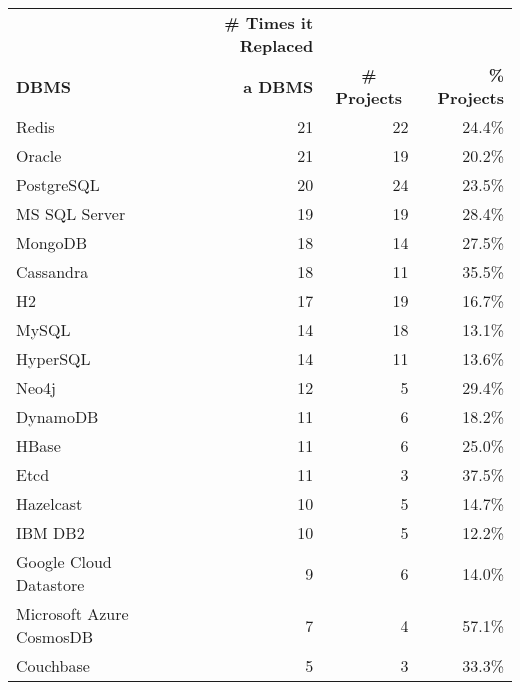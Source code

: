 \begin{tabular}{lrrr}
\hline
\multicolumn{1}{l}{\textbf{}} & \multicolumn{1}{r}{\textbf{\# Times it Replaced}} & \multicolumn{1}{c}{\textbf{}} & \textbf{} \\
\multicolumn{1}{l}{\textbf{DBMS}} & \multicolumn{1}{r}{\textbf{ a DBMS}} & \multicolumn{1}{c}{\textbf{\# Projects}} & \textbf{\% Projects} \\
\hline
                   Redis &                          21 &          22 &       24.4\% \\
                  Oracle &                          21 &          19 &       20.2\% \\
              PostgreSQL &                          20 &          24 &       23.5\% \\
           MS SQL Server &                          19 &          19 &       28.4\% \\
                 MongoDB &                          18 &          14 &       27.5\% \\
               Cassandra &                          18 &          11 &       35.5\% \\
                      H2 &                          17 &          19 &       16.7\% \\
                   MySQL &                          14 &          18 &       13.1\% \\
                HyperSQL &                          14 &          11 &       13.6\% \\
                   Neo4j &                          12 &           5 &       29.4\% \\
                DynamoDB &                          11 &           6 &       18.2\% \\
                   HBase &                          11 &           6 &       25.0\% \\
                    Etcd &                          11 &           3 &       37.5\% \\
               Hazelcast &                          10 &           5 &       14.7\% \\
                 IBM DB2 &                          10 &           5 &       12.2\% \\
  Google Cloud Datastore &                           9 &           6 &       14.0\% \\
Microsoft Azure CosmosDB &                           7 &           4 &       57.1\% \\
               Couchbase &                           5 &           3 &       33.3\% \\

\end{tabular}
